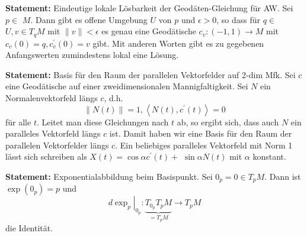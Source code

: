 \documentclass[10pt, letterpaper]{article}
\begin{document}
\vspace{0.8cm}


\textbf{Statement: }{Eindeutige lokale Lösbarkeit der Geodäten-Gleichung für AW}.
Sei $p \in$ $M$. Dann gibt es offene Umgebung $U$ von $p$ und $\epsilon>0$, so dass für $q \in$ $U, v \in T_{q} M$ mit $\|v\|<\epsilon$ es genau eine Geodätische $c_{v}:(-1,1) \rightarrow M$ mit $c_{v}(0)=q, c_{v}^{\prime}(0)=v$ gibt. Mit anderen Worten gibt es zu gegebenen Anfangswerten zumindestens lokal eine Lösung.

\StructurePic{}{}{%
  \begin{outline}
    
  \end{outline}
}

\vspace{0.8cm}


\textbf{Statement: }{Basis für den Raum der parallelen Vektorfelder auf 2-dim Mfk}.
Sei $c$ eine Geodätische auf einer zweidimensionalen Mannigfaltigkeit. Sei $N$ ein Normalenvektorfeld längs $c$, d.h. 
$$\|N(t)\|=1,\left\langle N(t), c^{\prime}(t)\right\rangle=0$$ 
für alle $t$. Leitet man diese Gleichungen nach $t$ ab, so ergibt sich, dass auch $N$ ein paralleles Vektorfeld längs $c$ ist. Damit haben wir eine Basis für den Raum der parallelen Vektorfelder längs $c$. Ein beliebiges paralleles Vektorfeld mit Norm 1 lässt sich schreiben als $X(t)=\cos \alpha c^{\prime}(t)+$ $\sin \alpha N(t)$ mit $\alpha$ konstant.

\StructurePic{}{}{%
  \begin{outline}
    
  \end{outline}
}

\vspace{0.8cm}


\textbf{Statement: }{Exponentialabbildung beim Basispunkt}.
Sei $0_{p}=0 \in T_{p} M$. Dann ist $\exp \left(0_{p}\right)=p$ und
$$
\left.d \exp _{p}\right|_{0_{p}}: \underbrace{T_{0_{p}} T_{p} M}_{=T_{p} M} \rightarrow T_{p} M
$$
die Identität.

\end{document}
